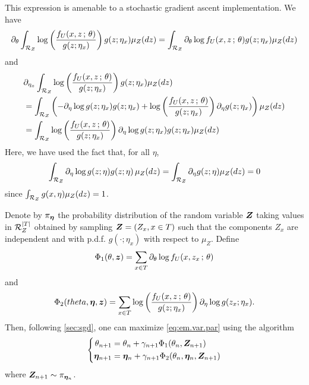 This expression is amenable to a stochastic gradient ascent implementation. We have 
\[
\partial_\theta \int_{{\mathcal R}_Z} \log \left(\frac{f_U(x,
z\,;\,\theta)}{g(z;\eta_x)}\right) g(z;\eta_x) \mu_Z(dz) = \int_{{\mathcal R}_Z} \partial_\theta \log f_U(x,
z\,;\,\theta) g(z;\eta_x) \mu_Z(dz)
\]
and 
\begin{align*}
&\partial_{\eta_x} \int_{{\mathcal R}_Z} \log \left(\frac{f_U(x,
z\,;\,\theta)}{g(z;\eta_x)}\right) g(z;\eta_x) \mu_Z(dz) \\
&= 
  \int_{{\mathcal R}_Z} \left(-\partial_\eta \log g(z;\eta_x) g(z;\eta_x) + \log \left(\frac{f_U(x,
z\,;\,\theta)}{g(z;\eta_x)}\right) \partial_\eta g(z;\eta_x)\right) \mu_Z(dz)\\
 &= 
  \int_{{\mathcal R}_Z}\log \left(\frac{f_U(x,
z\,;\,\theta)}{g(z;\eta_x)}\right)\partial_\eta \log g(z;\eta_x) g(z;\eta_x)  \mu_Z(dz)
\end{align*}
Here, we have used the fact that, for all $\eta$, 
\[
  \int_{{\mathcal R}_Z} \partial_\eta \log g(z;\eta) g(z;\eta)\,\mu_Z(dz) =   \int_{{\mathcal R}_Z} \partial_\eta  g(z;\eta)\mu_Z(dz) = 0
  \]
  since $\int_{{\mathcal R}_Z} g(x, \eta)\mu_Z(dz) = 1$.
  
Denote by $\pi_{{\bm{\eta}}}$ the probability distribution of the random variable ${\bm{Z}}$ taking values in ${\mathcal R}_Z^{|T|}$ obtained by  sampling ${\bm{Z}}= (Z_x, x\in T)$ such that the components $Z_x$ are independent and with p.d.f. $g(\cdot;\eta_x)$ with respect to $\mu_Z$. Define
\[
\Phi_1(\theta, {\bm{z}}) =  \sum_{x\in T} \partial_\theta \log f_U(x, z_x\,;\,\theta)
\]
and
\[
\Phi_2(theta, {\bm{\eta}}, {\bm{z}}) = \sum_{x\in T}\log \left(\frac{f_U(x,
z\,;\,\theta)}{g(z;\eta_x)}\right)\partial_\eta \log g(z_x;\eta_x).
\]
Then, following \cref{sec:sgd}, one can maximize \cref{eq:em.var.par} using the algorithm
\begin{equation}
\label{eq:sga.var.1}
\left\{
\begin{aligned}
\theta_{n+1} &= \theta_n + \gamma_{n+1} \Phi_1(\theta_n, {\bm{Z}}_{n+1})\\
{\bm{\eta}}_{n+1} &= {\bm{\eta}}_n + \gamma_{n+1} \Phi_2(\theta_n, {\bm{\eta}}_n, {\bm{Z}}_{n+1})
\end{aligned}
\right.
\end{equation}
where ${\bm{Z}}_{n+1} \sim \pi_{{\bm{\eta}}_n}$. 

